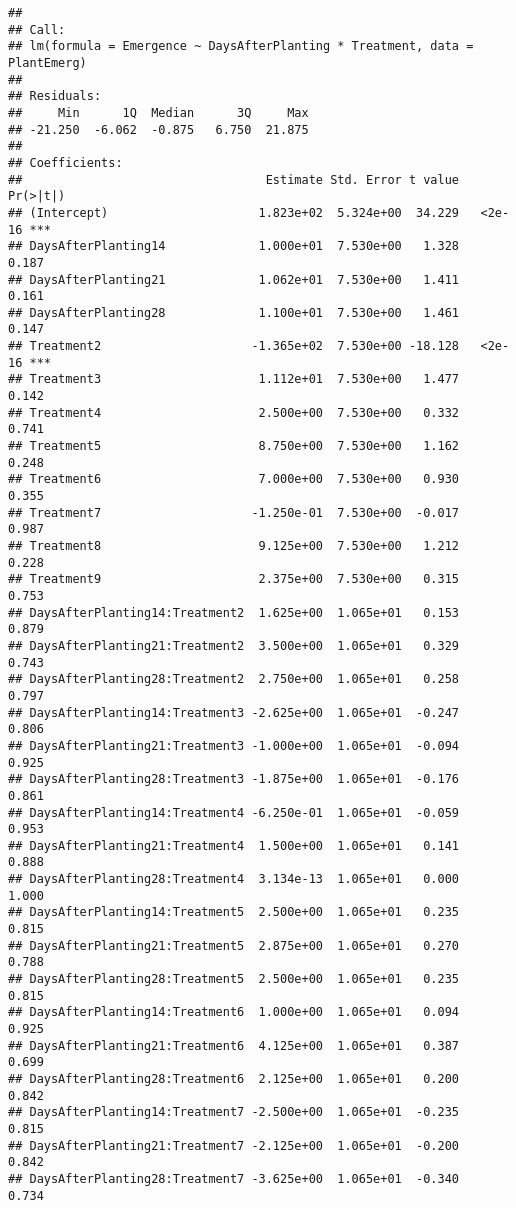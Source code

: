 \documentclass[
  12pt,
]{article}
\begin{document}
\begin{verbatim}
## 
## Call:
## lm(formula = Emergence ~ DaysAfterPlanting * Treatment, data = PlantEmerg)
## 
## Residuals:
##     Min      1Q  Median      3Q     Max 
## -21.250  -6.062  -0.875   6.750  21.875 
## 
## Coefficients:
##                                  Estimate Std. Error t value Pr(>|t|)    
## (Intercept)                     1.823e+02  5.324e+00  34.229   <2e-16 ***
## DaysAfterPlanting14             1.000e+01  7.530e+00   1.328    0.187    
## DaysAfterPlanting21             1.062e+01  7.530e+00   1.411    0.161    
## DaysAfterPlanting28             1.100e+01  7.530e+00   1.461    0.147    
## Treatment2                     -1.365e+02  7.530e+00 -18.128   <2e-16 ***
## Treatment3                      1.112e+01  7.530e+00   1.477    0.142    
## Treatment4                      2.500e+00  7.530e+00   0.332    0.741    
## Treatment5                      8.750e+00  7.530e+00   1.162    0.248    
## Treatment6                      7.000e+00  7.530e+00   0.930    0.355    
## Treatment7                     -1.250e-01  7.530e+00  -0.017    0.987    
## Treatment8                      9.125e+00  7.530e+00   1.212    0.228    
## Treatment9                      2.375e+00  7.530e+00   0.315    0.753    
## DaysAfterPlanting14:Treatment2  1.625e+00  1.065e+01   0.153    0.879    
## DaysAfterPlanting21:Treatment2  3.500e+00  1.065e+01   0.329    0.743    
## DaysAfterPlanting28:Treatment2  2.750e+00  1.065e+01   0.258    0.797    
## DaysAfterPlanting14:Treatment3 -2.625e+00  1.065e+01  -0.247    0.806    
## DaysAfterPlanting21:Treatment3 -1.000e+00  1.065e+01  -0.094    0.925    
## DaysAfterPlanting28:Treatment3 -1.875e+00  1.065e+01  -0.176    0.861    
## DaysAfterPlanting14:Treatment4 -6.250e-01  1.065e+01  -0.059    0.953    
## DaysAfterPlanting21:Treatment4  1.500e+00  1.065e+01   0.141    0.888    
## DaysAfterPlanting28:Treatment4  3.134e-13  1.065e+01   0.000    1.000    
## DaysAfterPlanting14:Treatment5  2.500e+00  1.065e+01   0.235    0.815    
## DaysAfterPlanting21:Treatment5  2.875e+00  1.065e+01   0.270    0.788    
## DaysAfterPlanting28:Treatment5  2.500e+00  1.065e+01   0.235    0.815    
## DaysAfterPlanting14:Treatment6  1.000e+00  1.065e+01   0.094    0.925    
## DaysAfterPlanting21:Treatment6  4.125e+00  1.065e+01   0.387    0.699    
## DaysAfterPlanting28:Treatment6  2.125e+00  1.065e+01   0.200    0.842    
## DaysAfterPlanting14:Treatment7 -2.500e+00  1.065e+01  -0.235    0.815    
## DaysAfterPlanting21:Treatment7 -2.125e+00  1.065e+01  -0.200    0.842    
## DaysAfterPlanting28:Treatment7 -3.625e+00  1.065e+01  -0.340    0.734    

\end{verbatim}
\end{document}
